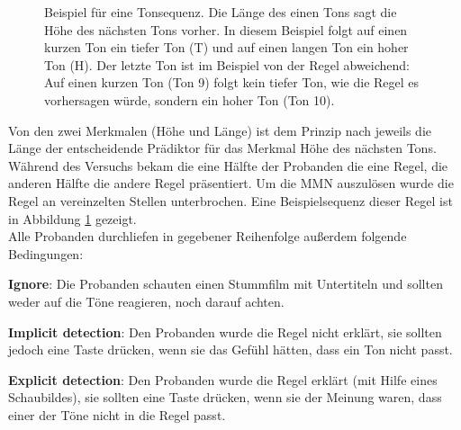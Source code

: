 \documentclass[doc,a4paper,12pt]{apa6}
\begin{document}
\begin{figure}[t]
  \centering
  \begin{minipage}{\textwidth}
    \setlength{\fboxsep}{.05\textwidth}
    \vspace{10pt}
    \caption{Beispiel für eine Tonsequenz. Die Länge des einen Tons sagt die Höhe des nächsten Tons vorher. In diesem Beispiel folgt auf einen kurzen Ton ein tiefer Ton (T) und auf einen langen Ton ein hoher Ton (H). Der letzte Ton ist im Beispiel von der Regel abweichend: Auf einen kurzen Ton (Ton 9) folgt kein tiefer Ton, wie die Regel es vorhersagen würde, sondern ein hoher Ton (Ton 10).}
    \label{stimuli}
  \end{minipage}
\end{figure}

Von den zwei Merkmalen (Höhe und Länge) ist dem Prinzip nach jeweils die Länge der entscheidende Prädiktor für das Merkmal Höhe des nächsten Tons. Während des Versuchs bekam die eine Hälfte der Probanden die eine Regel, die anderen Hälfte die andere Regel präsentiert. Um die MMN auszulösen wurde die Regel an vereinzelten Stellen unterbrochen. Eine Beispielsequenz dieser Regel ist in Abbildung \ref{stimuli} gezeigt.\\
Alle Probanden durchliefen in gegebener Reihenfolge außerdem folgende Bedingungen:

\begin{compactitem}
  \item \textbf{Ignore}: Die Probanden schauten einen Stummfilm mit Untertiteln und sollten weder auf die Töne reagieren, noch darauf achten.
  \item \textbf{Implicit detection}: Den Probanden wurde die Regel nicht erklärt, sie sollten jedoch eine Taste drücken, wenn sie das Gefühl hätten, dass ein Ton nicht passt.
  \item \textbf{Explicit detection}: Den Probanden wurde die Regel erklärt (mit Hilfe eines Schaubildes), sie sollten eine Taste drücken, wenn sie der Meinung waren, dass einer der Töne nicht in die Regel passt.
\end{compactitem}
\end{document}
